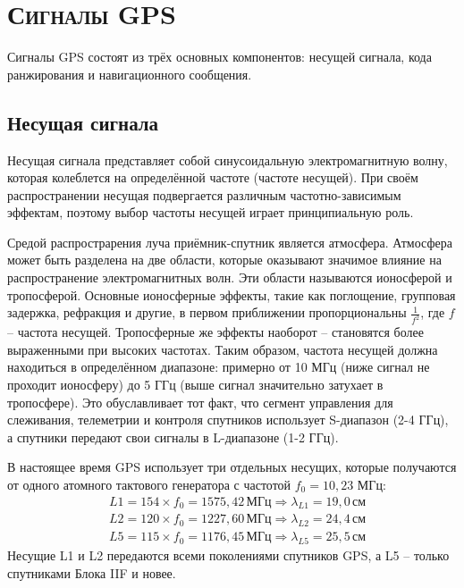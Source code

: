 \section{\textsc{Сигналы GPS}}

Сигналы GPS состоят из трёх основных компонентов: несущей сигнала, кода ранжирования и навигационного сообщения.

\subsection*{\textbf{Несущая сигнала}}

Несущая сигнала представляет собой синусоидальную электромагнитную волну, которая колеблется на определённой частоте (частоте несущей). 
При своём распространении несущая подвергается различным частотно-зависимым эффектам, поэтому выбор частоты несущей играет принципиальную роль.  

Средой распрострарения луча приёмник-спутник является атмосфера.
Атмосфера может быть разделена на две области, которые оказывают значимое влияние на распространение электромагнитных волн.
Эти области называются ионосферой и тропосферой.
Основные ионосферные эффекты, такие как поглощение, групповая задержка, рефракция и другие, в первом приближении пропорциональны $\frac{1}{f^2}$, где $f$ -- частота несущей. 
Тропосферные же эффекты наоборот -- становятся более выраженными при высоких частотах.
Таким образом, частота несущей должна находиться в определённом диапазоне: примерно от 10 МГц (ниже сигнал не проходит ионосферу) до 5 ГГц (выше сигнал значительно затухает в тропосфере).
Это обуславливает тот факт, что сегмент управления для слеживания, телеметрии и контроля спутников использует S-диапазон (2-4 ГГц), а спутники передают свои сигналы в L-диапазоне (1-2 ГГц).

В настоящее время GPS использует три отдельных несущих, которые получаются от одного атомного тактового генератора с частотой $f_0=10,23$ МГц:
\begin{equation}
\label{eq-carriers}
\begin{aligned}
&L1=154\times f_0=1575,42\,\text{МГц}\Rightarrow\lambda_{L1}=19,0\,\text{см} \\
&L2=120\times f_0=1227,60\,\text{МГц}\Rightarrow\lambda_{L2}=24,4\,\text{см} \\
&L5=115\times f_0=1176,45\,\text{МГц}\Rightarrow\lambda_{L5}=25,5\,\text{см} 
\end{aligned}
\end{equation}
Несущие L1 и L2 передаются всеми поколениями спутников GPS, а L5 -- только спутниками Блока IIF и новее. 

